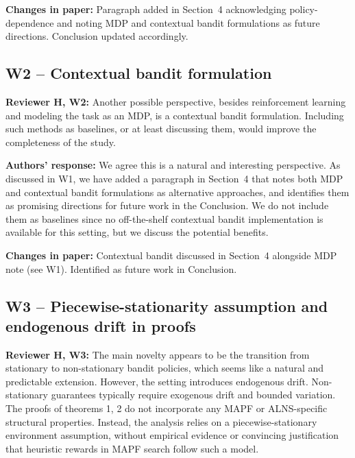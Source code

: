 \documentclass[review]{jair}
\begin{document}
\begin{changebox}
\textbf{Changes in paper:} Paragraph added in Section~4 acknowledging policy-dependence and noting MDP and contextual bandit formulations as future directions. Conclusion updated accordingly.
\end{changebox}

\subsection*{W2 -- Contextual bandit formulation}

\begin{reviewerbox}
\textbf{Reviewer H, W2:} Another possible perspective, besides reinforcement learning and modeling the task as an MDP, is a contextual bandit formulation. Including such methods as baselines, or at least discussing them, would improve the completeness of the study.
\end{reviewerbox}

\begin{authorbox}
\textbf{Authors' response:} We agree this is a natural and interesting perspective. As discussed in W1, we have added a paragraph in Section~4 that notes both MDP and contextual bandit formulations as alternative approaches, and identifies them as promising directions for future work in the Conclusion. We do not include them as baselines since no off-the-shelf contextual bandit implementation is available for this setting, but we discuss the potential benefits.
\end{authorbox}

\begin{changebox}
\textbf{Changes in paper:} Contextual bandit discussed in Section~4 alongside MDP note (see W1). Identified as future work in Conclusion.
\end{changebox}

\subsection*{W3 -- Piecewise-stationarity assumption and endogenous drift in proofs}

\begin{reviewerbox}
\textbf{Reviewer H, W3:} The main novelty appears to be the transition from stationary to non-stationary bandit policies, which seems like a natural and predictable extension. However, the setting introduces endogenous drift. Non-stationary guarantees typically require exogenous drift and bounded variation. The proofs of theorems 1, 2 do not incorporate any MAPF or ALNS-specific structural properties. Instead, the analysis relies on a piecewise-stationary environment assumption, without empirical evidence or convincing justification that heuristic rewards in MAPF search follow such a model.
\end{reviewerbox}
\end{document}
